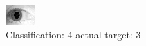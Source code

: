 \begin{figure}[h!]
\begin{center}
\includegraphics[width=0.60\columnwidth]{figures/ID1836_class_4_target_3.png}
\end{center}
\caption{ Classification: 4 actual target: 3}
\label{fig:ID1836_class_4_target_3}
\end{figure}
